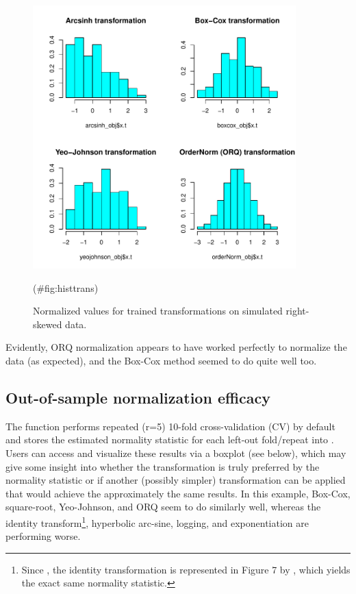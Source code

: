 \begin{Schunk}
\begin{figure}

{\centering \includegraphics[width=4in,height=4in]{figs/histtrans-1} 

}

\caption[Normalized values for trained transformations on simulated right-skewed data]{Normalized values for trained transformations on simulated right-skewed data.}(\#fig:histtrans)
\end{figure}
\end{Schunk}

Evidently, ORQ normalization appears to have worked perfectly to
normalize the data (as expected), and the Box-Cox method seemed to do
quite well too.

\hypertarget{out-of-sample-normalization-efficacy}{%
\subsection{Out-of-sample normalization
efficacy}\label{out-of-sample-normalization-efficacy}}

The  function performs repeated (r=5) 10-fold
cross-validation (CV) by default and stores the estimated normality
statistic for each left-out fold/repeat into
. Users can access and visualize these
results via a boxplot (see below), which may give some insight into
whether the transformation is truly preferred by the normality statistic
or if another (possibly simpler) transformation can be applied that
would achieve the approximately the same results. In this example,
Box-Cox, square-root, Yeo-Johnson, and ORQ seem to do similarly well,
whereas the identity
transform\footnote{Since , the identity transformation is represented in Figure 7 by , which yields the exact same normality statistic.},
hyperbolic arc-sine, logging, and exponentiation are performing worse.

